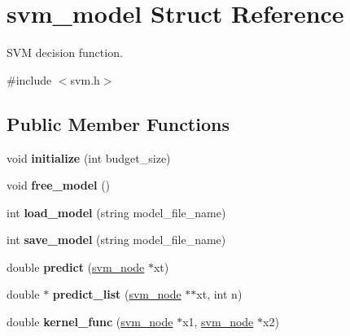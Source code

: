 \hypertarget{structsvm__model}{\section{svm\+\_\+model Struct Reference}
\label{structsvm__model}
}


S\+V\+M decision function.  




{\ttfamily \#include $<$svm.\+h$>$}

\subsection*{Public Member Functions}
\begin{DoxyCompactItemize}
\item 
\hypertarget{structsvm__model_a8ab0be97d0f3cb8acd9be2e97bfad5f9}{void {\bfseries initialize} (int budget\+\_\+size)}\label{structsvm__model_a8ab0be97d0f3cb8acd9be2e97bfad5f9}

\item 
\hypertarget{structsvm__model_a3b999f2313adb3888919902aef7e70a3}{void {\bfseries free\+\_\+model} ()}\label{structsvm__model_a3b999f2313adb3888919902aef7e70a3}

\item 
\hypertarget{structsvm__model_aa4a5acf3ca9d54ce06398b12b0ca6fa9}{int {\bfseries load\+\_\+model} (string model\+\_\+file\+\_\+name)}\label{structsvm__model_aa4a5acf3ca9d54ce06398b12b0ca6fa9}

\item 
\hypertarget{structsvm__model_a290e8428f3fe33b3581306c63093a478}{int {\bfseries save\+\_\+model} (string model\+\_\+file\+\_\+name)}\label{structsvm__model_a290e8428f3fe33b3581306c63093a478}

\item 
\hypertarget{structsvm__model_af59045b69bc5d1056f523969c7326301}{double {\bfseries predict} (\hyperlink{structsvm__node}{svm\+\_\+node} $\ast$xt)}\label{structsvm__model_af59045b69bc5d1056f523969c7326301}

\item 
\hypertarget{structsvm__model_aa1480d3f501537dfd00d8a80f648b1e4}{double $\ast$ {\bfseries predict\+\_\+list} (\hyperlink{structsvm__node}{svm\+\_\+node} $\ast$$\ast$xt, int n)}\label{structsvm__model_aa1480d3f501537dfd00d8a80f648b1e4}

\item 
\hypertarget{structsvm__model_a0b97140c12fa296cecce356349639e60}{double {\bfseries kernel\+\_\+func} (\hyperlink{structsvm__node}{svm\+\_\+node} $\ast$x1, \hyperlink{structsvm__node}{svm\+\_\+node} $\ast$x2)}\label{structsvm__model_a0b97140c12fa296cecce356349639e60}

\end{DoxyCompactItemize}
